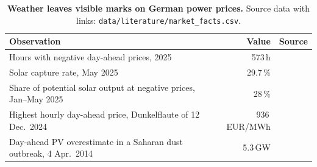 \begin{table}[t]
\centering\small
\caption{\textbf{Weather leaves visible marks on German power prices.} Source data with links: \texttt{data/literature/market\_facts.csv}.}
\label{tab:market}
\setlength{\tabcolsep}{3pt}
\begin{tabular}{@{}L{4.55cm}rl@{}}
\toprule
Observation & Value & Source \\
\midrule
Hours with negative day-ahead prices, 2025 & 573\,h & \cite{smard2026solar} \\
Solar capture rate, May 2025 & 29.7\,\% & \cite{spglobal2025capture} \\
Share of potential solar output at negative prices, Jan--May 2025 & 28\,\% & \cite{pvmag2025negative} \\
Highest hourly day-ahead price, Dunkelflaute of 12 Dec.\ 2024 & 936\,EUR/MWh & \cite{smard2025peaks} \\
Day-ahead PV overestimate in a Saharan dust outbreak, 4 Apr.\ 2014 & 5.3\,GW & \cite{rieger2017dust} \\
\bottomrule
\end{tabular}
\end{table}
